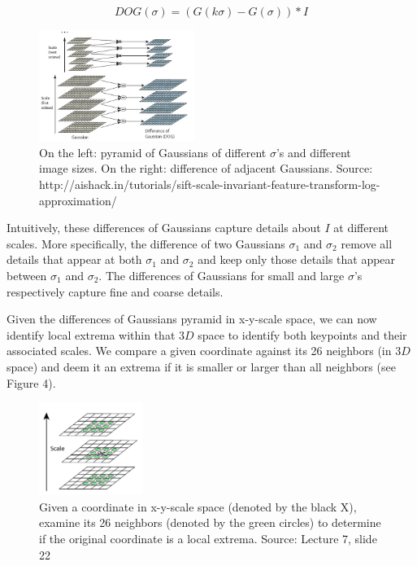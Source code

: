 \documentclass{article}
\begin{document}
$$DOG(\sigma) = (G(k\sigma) - G(\sigma)) * I$$

\begin{figure}[h]
  \centering
  \includegraphics[width=0.45\textwidth]{dog_pyramid}
  \caption{On the left: pyramid of Gaussians of different $\sigma$'s and different image sizes. On the right: difference of adjacent Gaussians. Source: http://aishack.in/tutorials/sift-scale-invariant-feature-transform-log-approximation/}
\end{figure}

Intuitively, these differences of Gaussians capture details about $I$ at different scales. More specifically, the difference of two Gaussians $\sigma_1$ and $\sigma_2$ remove all details that appear at both $\sigma_1$ and $\sigma_2$ and keep only those details that appear between $\sigma_1$ and $\sigma_2$. The differences of Gaussians for small and large $\sigma$'s respectively capture fine and coarse details.

Given the differences of Gaussians pyramid in x-y-scale space, we can now identify local extrema within that $3D$ space to identify both keypoints and their associated scales. We compare a given coordinate against its 26 neighbors (in $3D$ space) and deem it an extrema if it is smaller or larger than all neighbors (see Figure 4).

\begin{figure}[h]
  \centering
  \includegraphics[width=0.3\textwidth]{maxima}
  \caption{Given a coordinate in x-y-scale space (denoted by the black X), examine its 26 neighbors (denoted by the green circles) to determine if the original coordinate is a local extrema. Source: Lecture 7, slide 22}
\end{figure}
\end{document}
